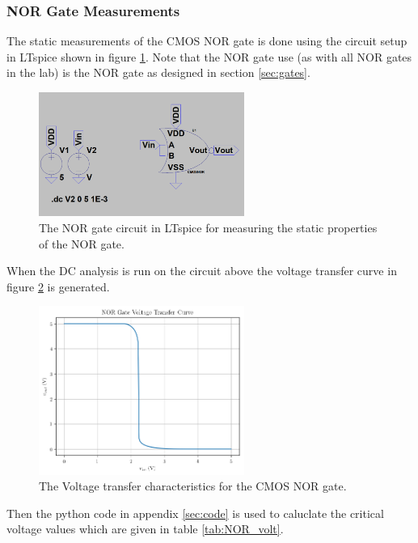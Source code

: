 \documentclass[titlepage, 12pt]{article}
\begin{document}
    \subsubsection{NOR Gate Measurements}
    The static measurements of the CMOS NOR gate is done using the
    circuit setup in LTspice shown in figure \ref{fig:part_21_NOR}.
    Note that the NOR gate use (as with all NOR gates in the lab) is
    the NOR gate as designed in section \ref{sec:gates}.
    \begin{figure}[H]
        \centering
        \includegraphics[width=0.6\textwidth]{figures/part_21_NOR_circuit.png}
        \caption{The NOR gate circuit in LTspice for measuring the
        static properties of the NOR gate.}
        \label{fig:part_21_NOR}
    \end{figure}
    When the DC analysis is run on the circuit above the voltage
    transfer curve in figure \ref{fig:NOR_VTC} is generated.
    \begin{figure}[H]
        \centering
        \includegraphics[width=0.6\textwidth]{figures/part_21_NOR.png}
        \caption{The Voltage transfer characteristics for the CMOS NOR
        gate.}
        \label{fig:NOR_VTC}
    \end{figure}
    Then the python code in appendix \ref{sec:code} is used to caluclate
    the critical voltage values which are given in table
    \ref{tab:NOR_volt}.
\end{document}
